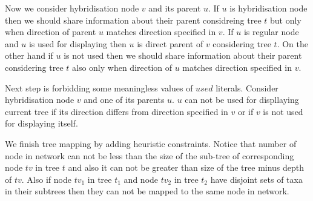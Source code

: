 \documentclass[runningheads, envcountsame, a4paper]{llncs}
\begin{document}
Now we consider hybridisation node $v$ and its parent $u$. If $u$ is hybridisation node then we should share information 
about their parent considreing tree $t$ but only when direction of parent $u$ matches direction specified in $v$. 
If $u$ is regular node and $u$ is used for displaying then $u$ is direct parent of $v$ considering tree $t$.
On the other hand if $u$ is not used then we should share information about their parent considering tree $t$ also 
only when direction of $u$ matches direction specified in $v$.

Next step is forbidding some meaningless values of $used$ literals. Consider hybridisation node $v$ and one of its parents $u$. 
$u$ can not be used for displlaying current tree if its direction differs from direction specified in $v$ or if $v$ is 
not used for displaying itself.

We finish tree mapping by adding heuristic constraints. Notice that number of node in network can not be less than the 
size of the sub-tree of corresponding node $tv$ in tree $t$ and also it can not be greater than size of the tree minus 
depth of $tv$. Also if node $tv_1$ in tree $t_1$ and node $tv_2$ in tree $t_2$ have disjoint sets of taxa in their 
subtrees then they can not be mapped to the same node in network.
\end{document}

